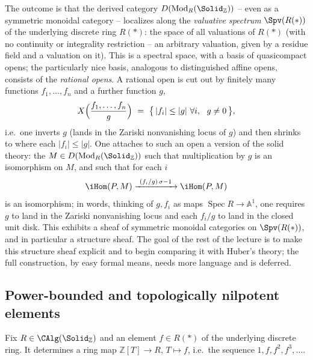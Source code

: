 \begin{remark}
\label{rmk:7:valuative-spectrum}
The outcome is that the derived category
$D(\mathrm{Mod}_{R}(\Solid_{\mathbb{Z}}))$ -- even as a symmetric monoidal
category -- localizes along the \emph{valuative spectrum}
$\Spv(R(\ast))$ of the underlying discrete ring $R(\ast)$: the space of all
valuations of $R(\ast)$ (with no continuity or integrality restriction -- an
arbitrary valuation, given by a residue field and a valuation on it). This is a
spectral space, with a basis of quasicompact opens; the particularly nice
basis, analogous to distinguished affine opens, consists of the
\emph{rational opens}. A rational open is cut out by finitely many functions
$f_1,\dots,f_n$ and a further function $g$,
\begin{equation}
\label{eq:7:rational-open}
X\Bigl(\frac{f_1,\dots,f_n}{g}\Bigr)\ =\ \bigl\{\,|f_i|\le|g|\ \forall i,\
\ g\neq0\,\bigr\},
\end{equation}
i.e.\ one inverts $g$ (lands in the Zariski nonvanishing locus of $g$) and
then shrinks to where each $|f_i|\le|g|$. One attaches to such an open a
version of the solid theory: the $M\in D(\mathrm{Mod}_{R}(\Solid_{\mathbb{Z}}))$
such that multiplication by $g$ is an isomorphism on $M$, and such that for
each $i$
\begin{equation*}
\iHom(P,M)\xrightarrow{\ (f_i/g)\,\sigma-1\ }\iHom(P,M)
\end{equation*}
is an isomorphism; in words, thinking of $g,f_i$ as maps
$\operatorname{Spec}R\to\mathbb{A}^1$, one requires $g$ to land in the Zariski
nonvanishing locus and each $f_i/g$ to land in the closed unit disk. This
exhibits a sheaf of symmetric monoidal categories on $\Spv(R(\ast))$, and in
particular a structure sheaf. The goal of the rest of the lecture is to make
this structure sheaf explicit and to begin comparing it with Huber's theory;
the full construction, by easy formal means, needs more language and is
deferred.
\end{remark}

\subsection{Power-bounded and topologically nilpotent elements}

Fix $R\in\CAlg(\Solid_{\mathbb{Z}})$ and an element $f\in R(\ast)$ of the
underlying discrete ring. It determines a ring map $\mathbb{Z}[T]\to R$,
$T\mapsto f$, i.e.\ the sequence $1,f,f^2,f^3,\dots$.

